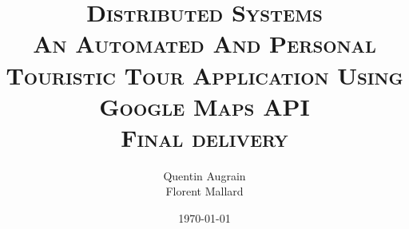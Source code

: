 \documentclass[a4paper]{article}
\title{
\textsc{Distributed Systems\\
\LARGE An Automated And Personal Touristic Tour Application Using Google Maps API \\
Final delivery}
}
\author
{
	Quentin {\sc Augrain}\\
    Florent {\sc Mallard}\\
}
\date{\today}
\begin{document}
\maketitle

\newpage{}
\tableofcontents
\newpage{}






\end{document}

